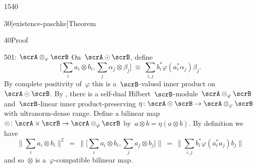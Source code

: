 \begin{parsec}{1540}
\begin{point}{30}[existence-paschke]{Theorem}
\begin{point}{40}{Proof}
\begin{point}{50}{1: $\scrA \otimes_\varphi \scrB$}
On~$\scrA \odot \scrB$, define
\begin{equation*}
    \bigl[\sum_i a_i \otimes b_i, \sum_j \alpha_j \otimes \beta_j\bigr]
    \ \equiv\  \sum_{i,j} b_i^* \varphi(a_i^*\alpha_j)\beta_j.
\end{equation*}
By complete positivity of~$\varphi$
this is a~$\scrB$-valued inner product on~$\scrA \odot \scrB$.
By ,
    there is a self-dual Hilbert~$\scrB$-module~$\scrA\otimes_\varphi \scrB$
    and~$\scrB$-linear inner product-preserving
    $\eta\colon \scrA \odot \scrB \to \scrA \otimes_\varphi \scrB$
    with ultranorm-dense range.
Define a bilinear map~$\otimes \colon \scrA \times \scrB \to \scrA \otimes_\varphi \scrB$
    by~$a \otimes b = \eta(a \otimes b)$.
By definition we have
\begin{equation*}
\bigl\| \sum_i a_i \otimes b_i \bigr\|^2
    \ =\  \bigl\|\bigl[ \sum_i a_i\otimes b_i, \sum_j a_j \otimes b_j \bigr]\bigr\|
    \ =\  \bigl\|\sum_{i,j} b_i^* \varphi(a_i^*a_j) b_j\bigr\|
\end{equation*}
and so~$\otimes$ is a~$\varphi$-compatible bilinear map.


\end{point}
\end{point}
\end{point}
\end{parsec}
